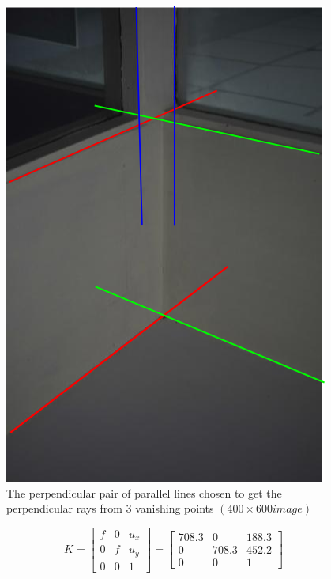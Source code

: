 \documentclass[fleqn]{article}
\begin{document}
\begin{itemize}
\begin{figure}[!ht]
\centering
\includegraphics[scale=0.4]{./pics/img1_ink}
\caption{The perpendicular pair of parallel lines chosen to get the perpendicular rays from 3 vanishing points $(400 \times 600 image)$}
\end{figure}
\[
 K = \begin{bmatrix}
   		f & 0 & u_x \\
   		0 & f & u_y \\
   		0 & 0 & 1
   \end{bmatrix}
=    \begin{bmatrix}
   		708.3 & 0 & 188.3 \\
   		0 & 708.3 & 452.2 \\
   		0 & 0 & 1
   \end{bmatrix}
\]


\end{itemize}
\end{document}
